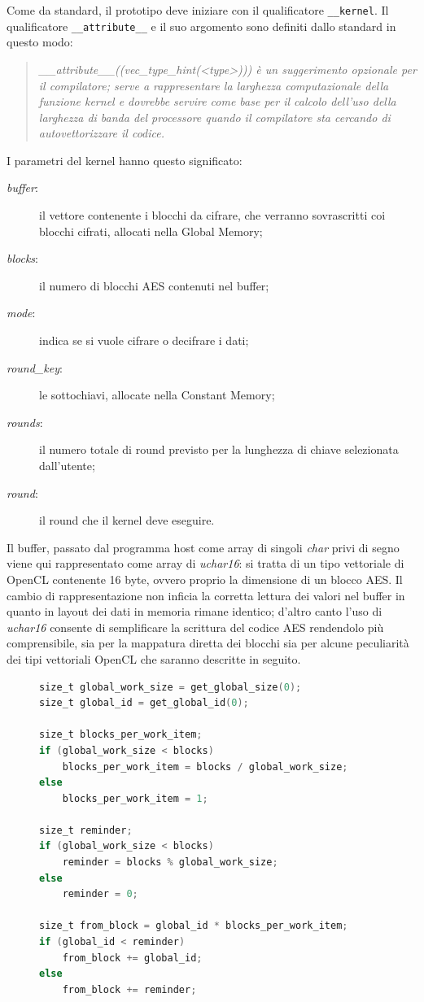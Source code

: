 \documentclass[12pt,a4paper,oneside]{book}
\begin{document}
Come da standard, il prototipo deve iniziare con il qualificatore \verb|__kernel|. Il qualificatore \verb|__attribute__| e il suo argomento sono definiti dallo standard in questo modo:
\begin{quotation}
\textit{\_\_attribute\_\_((vec\_type\_hint(<type>))) è un suggerimento opzionale per il compilatore; serve a rappresentare la larghezza computazionale della funzione kernel e dovrebbe servire come base per il calcolo dell'uso della larghezza di banda del processore quando il compilatore sta cercando di autovettorizzare il codice.}\cite{bib:opencl}
\end{quotation}

I parametri del kernel hanno questo significato:
\begin{description}
\item[\textit{buffer}:] il vettore contenente i blocchi da cifrare, che verranno sovrascritti coi blocchi cifrati, allocati nella Global Memory;
\item[\textit{blocks}:] il numero di blocchi \ac{AES} contenuti nel buffer;
\item[\textit{mode}:] indica se si vuole cifrare o decifrare i dati;
\item[\textit{round\_key}:] le sottochiavi, allocate nella Constant Memory;
\item[\textit{rounds}:] il numero totale di round previsto per la lunghezza di chiave selezionata dall'utente;
\item[\textit{round}:] il round che il kernel deve eseguire.
\end{description}

Il buffer, passato dal programma host come array di singoli \textit{char} privi di segno viene qui rappresentato come array di \textit{uchar16}: si tratta di un tipo vettoriale di \ac{OpenCL} contenente 16 byte, ovvero proprio la dimensione di un blocco \ac{AES}. Il cambio di rappresentazione non inficia la corretta lettura dei valori nel buffer in quanto in layout dei dati in memoria rimane identico; d'altro canto l'uso di \textit{uchar16} consente di semplificare la scrittura del codice \ac{AES} rendendolo più comprensibile, sia per la mappatura diretta dei blocchi sia per alcune peculiarità dei tipi vettoriali \ac{OpenCL} che saranno descritte in seguito.

\begin{figure}
\begin{lstlisting}[caption={\textit{Selezione dei blocchi per ciascun work-item.}},label={cod:paes-blocks},language=C]
size_t global_work_size = get_global_size(0);
size_t global_id = get_global_id(0);

size_t blocks_per_work_item;
if (global_work_size < blocks)
	blocks_per_work_item = blocks / global_work_size;
else
	blocks_per_work_item = 1;

size_t reminder;
if (global_work_size < blocks)
	reminder = blocks % global_work_size;
else
	reminder = 0;

size_t from_block = global_id * blocks_per_work_item;
if (global_id < reminder) 
	from_block += global_id;
else 
	from_block += reminder;
\end{lstlisting}
\end{figure}
\end{document}
